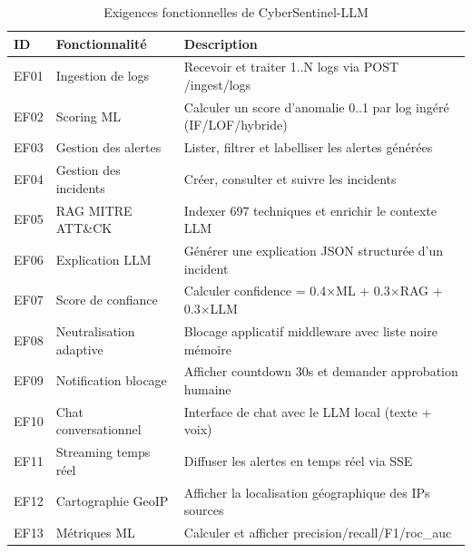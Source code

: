 \documentclass[12pt,a4paper]{report}
\begin{document}
\begin{table}[H]
\centering
\caption{Exigences fonctionnelles de CyberSentinel-LLM}
\label{tab:ef}
\begin{tabular}{|p{1cm}|p{4cm}|p{8.5cm}|}
\hline
\textbf{ID} & \textbf{Fonctionnalité} & \textbf{Description} \\
\hline
EF01 & Ingestion de logs & Recevoir et traiter 1..N logs via POST /ingest/logs \\
\hline
EF02 & Scoring ML & Calculer un score d'anomalie 0..1 par log ingéré (IF/LOF/hybride) \\
\hline
EF03 & Gestion des alertes & Lister, filtrer et labelliser les alertes générées \\
\hline
EF04 & Gestion des incidents & Créer, consulter et suivre les incidents \\
\hline
EF05 & RAG MITRE ATT\&CK & Indexer 697 techniques et enrichir le contexte LLM \\
\hline
EF06 & Explication LLM & Générer une explication JSON structurée d'un incident \\
\hline
EF07 & Score de confiance & Calculer confidence = 0.4×ML + 0.3×RAG + 0.3×LLM \\
\hline
EF08 & Neutralisation adaptive & Blocage applicatif middleware avec liste noire mémoire \\
\hline
EF09 & Notification blocage & Afficher countdown 30s et demander approbation humaine \\
\hline
EF10 & Chat conversationnel & Interface de chat avec le LLM local (texte + voix) \\
\hline
EF11 & Streaming temps réel & Diffuser les alertes en temps réel via SSE \\
\hline
EF12 & Cartographie GeoIP & Afficher la localisation géographique des IPs sources \\
\hline
EF13 & Métriques ML & Calculer et afficher precision/recall/F1/roc\_auc \\
\hline
\end{tabular}
\end{table}
\end{document}
